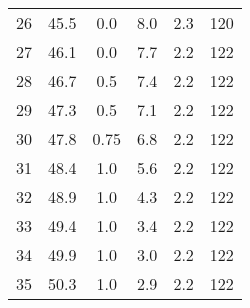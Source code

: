 \begin{table}[H]
\begin{tabular}{c c c c c c}
26 & 45.5 & 0.0	 & 8.0  & 2.3	& 120 \\
27 & 46.1 & 0.0	 & 7.7  & 2.2	& 122 \\
28 & 46.7 & 0.5	 & 7.4  & 2.2	& 122 \\
29 & 47.3 & 0.5	 & 7.1  & 2.2	& 122 \\
30 & 47.8 & 0.75 & 6.8  & 2.2	& 122 \\
31 & 48.4 & 1.0	 & 5.6  & 2.2	& 122 \\
32 & 48.9 & 1.0	 & 4.3  & 2.2	& 122 \\
33 & 49.4 & 1.0	 & 3.4  & 2.2	& 122 \\
34 & 49.9 & 1.0	 & 3.0  & 2.2	& 122 \\
35 & 50.3 & 1.0	 & 2.9  & 2.2	& 122 \\
\bottomrule
\end{tabular}
\end{table}
